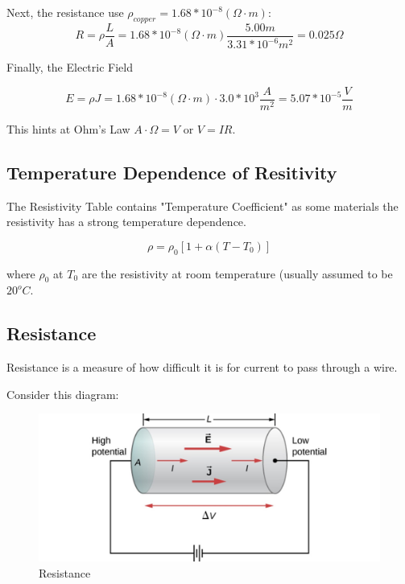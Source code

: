 \documentclass[14pt]{memoir}
\begin{document}
Next, the resistance use $\rho_{copper} = 1.68 * 10^{-8} (\Omega \cdot m)$:
\begin{equation}
R = \rho \frac{L}{A} = 1.68 * 10^{-8} (\Omega \cdot m) \frac{5.00 m}{3.31* 10^{-6} m^2} = 0.025 \Omega
\end{equation}

Finally, the Electric Field

\begin{equation}
E = \rho J = 1.68 * 10^{-8} (\Omega \cdot m) \cdot 3.0 * 10^3 \frac{A}{m^2} = 5.07 * 10^{-5} \frac{V}{m}
\end{equation}

This hints at Ohm's Law $A \cdot \Omega = V$ or $ V = IR$.

\subsection{Temperature Dependence of Resitivity}
The Resistivity Table contains "Temperature Coefficient" as some materials the resistivity has a strong temperature dependence. 

\begin{equation}
\rho = \rho_0 [1+\alpha(T-T_0)]
\end{equation}

where $\rho_0$ at $T_0$ are the resistivity at room temperature (usually assumed to be $20^o C$.

\subsection{Resistance}
Resistance is a measure of how difficult it is for current to pass through a wire. 

Consider this diagram:

\begin{figure}[H]
\begin{center}
\includegraphics[scale=0.50]{fig/fig_09_13.jpg}
\caption{Resistance}
\label{fig:09_13}
\end{center}
\end{figure}
\end{document}

